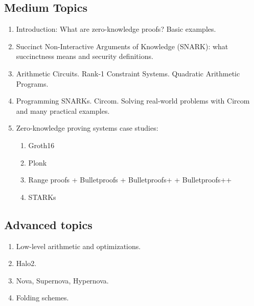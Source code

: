 \documentclass{zkdl-template}
\begin{document}
\subsection*{Medium Topics}
\begin{enumerate}
    \item Introduction: What are zero-knowledge proofs? Basic examples.
    \item Succinct Non-Interactive Arguments of Knowledge (SNARK): what succinctness means and security definitions. 
    \item Arithmetic Circuits. Rank-1 Constraint Systems. Quadratic Arithmetic Programs.
    \item Programming SNARKs. Circom. Solving real-world problems with Circom and many practical examples.
    \item Zero-knowledge proving systems case studies:
    \begin{enumerate}
        \item Groth16 
        \item Plonk 
        \item Range proofs + Bulletproofs + Bulletproofs+ + Bulletproofs++
        \item STARKs 
    \end{enumerate}
\end{enumerate}

\subsection*{Advanced topics}
\begin{enumerate}
    \item Low-level arithmetic and optimizations.
    \item Halo2.
    \item Nova, Supernova, Hypernova.
    \item Folding schemes.
\end{enumerate}
\end{document}
